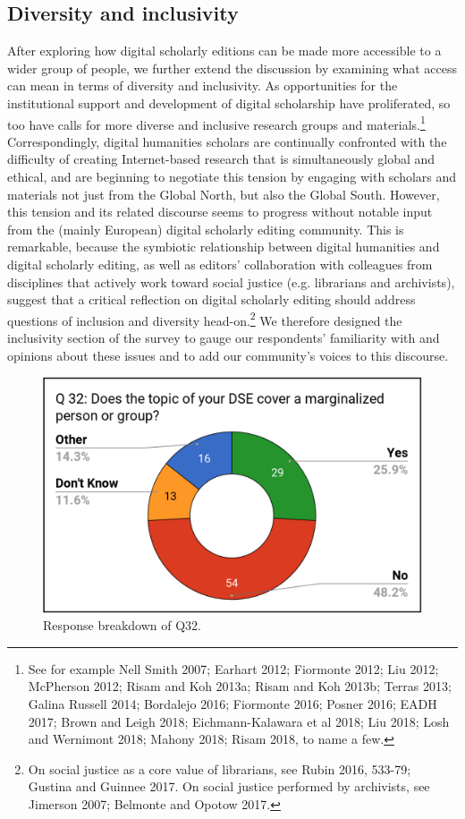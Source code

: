 \begin{paper}
\subsection{Diversity and inclusivity}

After exploring how digital scholarly editions can be made more
accessible to a wider group of people, we further extend the discussion
by examining what access can mean in terms of diversity and inclusivity.
As opportunities for the institutional support and development of
digital scholarship have proliferated, so too have calls for more
diverse and inclusive research groups and materials.\footnote{See for
  example Nell Smith 2007; Earhart 2012; Fiormonte 2012; Liu 2012;
  McPherson 2012; Risam and Koh 2013a; Risam and Koh 2013b; Terras 2013;
  Galina Russell 2014; Bordalejo 2016; Fiormonte 2016; Posner 2016; EADH
  2017; Brown and Leigh 2018; Eichmann-Kalawara et al 2018; Liu 2018; Losh and Wernimont 2018;
  Mahony 2018; Risam 2018, to name a few.}
Correspondingly, digital humanities scholars are continually confronted
with the difficulty of creating Internet-based research that is
simultaneously global and ethical, and are beginning to negotiate this
tension by engaging with scholars and materials not just from the Global
North, but also the Global South. However, this tension and its related
discourse seems to progress without notable input from the (mainly
European) digital scholarly editing community. This is remarkable,
because the symbiotic relationship between digital humanities and
digital scholarly editing, as well as editors' collaboration with
colleagues from disciplines that actively work toward social justice
(e.g. librarians and archivists), suggest that a critical reflection on
digital scholarly editing should address questions of inclusion and
diversity head-on.\footnote{On social justice as a core value of
  librarians, see Rubin 2016, 533-79; Gustina and Guinnee 2017. On
  social justice performed by archivists, see Jimerson 2007; Belmonte
  and Opotow 2017.} We therefore designed the inclusivity section of the
survey to gauge our respondents' familiarity with and opinions about
these issues and to add our community's voices to this discourse.

\begin{figure}[htb!]
\includegraphics[width=\textwidth]{media/martinez6.png}
\caption{Response breakdown of Q32.}
\label{q32}
\end{figure}


\end{paper}
